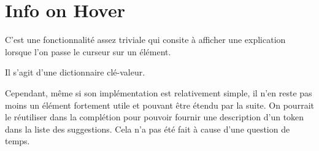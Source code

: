 \documentclass[
    iict, %
    il, %
]{heig-tb}
\begin{document}













\section{Info on Hover}

C'est une fonctionnalité assez triviale qui consite à afficher une explication lorsque l'on passe le curseur sur un élément.

Il s'agit d'une dictionnaire clé-valeur.

Cependant, même si son implémentation est relativement simple, il n'en reste pas moins un élément fortement utile et pouvant être étendu par la suite.
On pourrait le réutiliser dans la complétion pour pouvoir fournir une description d'un token dans la liste des suggestions.
Cela n'a pas été fait à cause d'une question de temps.
\end{document}
